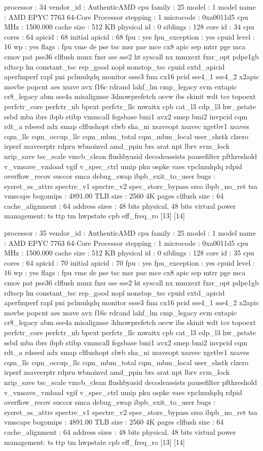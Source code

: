 processor	: 34
vendor_id	: AuthenticAMD
cpu family	: 25
model		: 1
model name	: AMD EPYC 7763 64-Core Processor
stepping	: 1
microcode	: 0xa0011d5
cpu MHz		: 1500.000
cache size	: 512 KB
physical id	: 0
siblings	: 128
core id		: 34
cpu cores	: 64
apicid		: 68
initial apicid	: 68
fpu		: yes
fpu_exception	: yes
cpuid level	: 16
wp		: yes
flags		: fpu vme de pse tsc msr pae mce cx8 apic sep mtrr pge mca cmov pat pse36 clflush mmx fxsr sse sse2 ht syscall nx mmxext fxsr_opt pdpe1gb rdtscp lm constant_tsc rep_good nopl nonstop_tsc cpuid extd_apicid aperfmperf rapl pni pclmulqdq monitor ssse3 fma cx16 pcid sse4_1 sse4_2 x2apic movbe popcnt aes xsave avx f16c rdrand lahf_lm cmp_legacy svm extapic cr8_legacy abm sse4a misalignsse 3dnowprefetch osvw ibs skinit wdt tce topoext perfctr_core perfctr_nb bpext perfctr_llc mwaitx cpb cat_l3 cdp_l3 hw_pstate ssbd mba ibrs ibpb stibp vmmcall fsgsbase bmi1 avx2 smep bmi2 invpcid cqm rdt_a rdseed adx smap clflushopt clwb sha_ni xsaveopt xsavec xgetbv1 xsaves cqm_llc cqm_occup_llc cqm_mbm_total cqm_mbm_local user_shstk clzero irperf xsaveerptr rdpru wbnoinvd amd_ppin brs arat npt lbrv svm_lock nrip_save tsc_scale vmcb_clean flushbyasid decodeassists pausefilter pfthreshold v_vmsave_vmload vgif v_spec_ctrl umip pku ospke vaes vpclmulqdq rdpid overflow_recov succor smca debug_swap ibpb_exit_to_user
bugs		: sysret_ss_attrs spectre_v1 spectre_v2 spec_store_bypass srso ibpb_no_ret tsa vmscape
bogomips	: 4891.00
TLB size	: 2560 4K pages
clflush size	: 64
cache_alignment	: 64
address sizes	: 48 bits physical, 48 bits virtual
power management: ts ttp tm hwpstate cpb eff_freq_ro [13] [14]

processor	: 35
vendor_id	: AuthenticAMD
cpu family	: 25
model		: 1
model name	: AMD EPYC 7763 64-Core Processor
stepping	: 1
microcode	: 0xa0011d5
cpu MHz		: 1500.000
cache size	: 512 KB
physical id	: 0
siblings	: 128
core id		: 35
cpu cores	: 64
apicid		: 70
initial apicid	: 70
fpu		: yes
fpu_exception	: yes
cpuid level	: 16
wp		: yes
flags		: fpu vme de pse tsc msr pae mce cx8 apic sep mtrr pge mca cmov pat pse36 clflush mmx fxsr sse sse2 ht syscall nx mmxext fxsr_opt pdpe1gb rdtscp lm constant_tsc rep_good nopl nonstop_tsc cpuid extd_apicid aperfmperf rapl pni pclmulqdq monitor ssse3 fma cx16 pcid sse4_1 sse4_2 x2apic movbe popcnt aes xsave avx f16c rdrand lahf_lm cmp_legacy svm extapic cr8_legacy abm sse4a misalignsse 3dnowprefetch osvw ibs skinit wdt tce topoext perfctr_core perfctr_nb bpext perfctr_llc mwaitx cpb cat_l3 cdp_l3 hw_pstate ssbd mba ibrs ibpb stibp vmmcall fsgsbase bmi1 avx2 smep bmi2 invpcid cqm rdt_a rdseed adx smap clflushopt clwb sha_ni xsaveopt xsavec xgetbv1 xsaves cqm_llc cqm_occup_llc cqm_mbm_total cqm_mbm_local user_shstk clzero irperf xsaveerptr rdpru wbnoinvd amd_ppin brs arat npt lbrv svm_lock nrip_save tsc_scale vmcb_clean flushbyasid decodeassists pausefilter pfthreshold v_vmsave_vmload vgif v_spec_ctrl umip pku ospke vaes vpclmulqdq rdpid overflow_recov succor smca debug_swap ibpb_exit_to_user
bugs		: sysret_ss_attrs spectre_v1 spectre_v2 spec_store_bypass srso ibpb_no_ret tsa vmscape
bogomips	: 4891.00
TLB size	: 2560 4K pages
clflush size	: 64
cache_alignment	: 64
address sizes	: 48 bits physical, 48 bits virtual
power management: ts ttp tm hwpstate cpb eff_freq_ro [13] [14]

